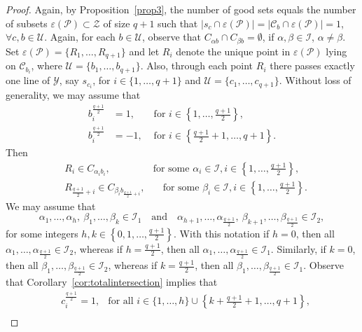\documentclass[11pt]{article}
\theoremstyle{definition}
\numberwithin{equation}{section}
\def\eps{\varepsilon}
\def\cC{\mathscr C}
\def\cI{\mathcal I}
\def\cP{\mathcal P}
\def\cU{\mathcal U}
\begin{document}
    
\begin{proof}
Again, by Proposition~\ref{prop3}, the number of good sets equals the number of subsets $\varepsilon(\mathcal{P}) \subset \mathcal{Z}$ of size $q+1$ such that $|s_c \cap \eps(\cP)| = |\cC_b \cap \eps(\cP)| = 1$, $\forall c,b \in \cU$. Again, for each $b \in \mathcal{U}$, observe that $C_{\alpha b} \cap C_{\beta b} = \emptyset$, if $\alpha, \beta \in \cI$, $\alpha \ne \beta$. Set $\eps(\cP) = \{R_1, \dots, R_{q+1}\}$ and let $R_i$ denote the unique point in $\varepsilon(\mathcal{P})$ lying on $\cC_{b_i}$, where $\mathcal{U} = \{b_1, \ldots, b_{q+1}\}$. Also, through each point $R_i$ there passes exactly one line of $\mathcal{Y}$, say $s_{c_i}$, for $i \in \{1, \ldots, q+1\}$ and $\cU=\{c_1,\ldots,c_{q+1}\}$. Without loss of generality, we may assume that 
\begin{align*}
b_i^{\frac{q+1}2} & =1, & \mbox{ for } i \in \left\{1,\ldots,\frac{q+1}2\right\}, \\
b_i^{\frac{q+1}2} & =-1, & \mbox{ for } i \in \left\{\frac{q+1}2+1,\ldots,q+1\right\}.
\end{align*}
Then
\begin{align*}
& R_i \in C_{\alpha_i b_i}, & \text{for some } \alpha_i \in \mathcal{I}, i \in \left\{1, \ldots, \frac{q+1}{2} \right\}, \\
& R_{\frac{q+1}{2}+i} \in C_{\beta_i b_{\frac{q+1}{2}+i}}, & \quad \text{for some } \beta_i \in \mathcal{I}, i \in \left\{1, \ldots, \frac{q+1}{2} \right\}. 
\end{align*}
We may assume that
\[
\alpha_1, \ldots, \alpha_h, \ \beta_1, \ldots, \beta_k \in \mathcal{I}_1
\quad \text{and} \quad
\alpha_{h+1}, \ldots, \alpha_{\frac{q+1}{2}}, \ \beta_{k+1}, \ldots, \beta_{\frac{q+1}{2}} \in \mathcal{I}_2,
\]
for some integers \( h, k \in \left\{0, 1, \ldots, \frac{q+1}{2} \right\} \). With this notation if \( h = 0 \), then all \( \alpha_1, \ldots, \alpha_{\frac{q+1}{2}} \in \mathcal{I}_2 \), whereas if \( h = \frac{q+1}{2} \), then all \( \alpha_1, \ldots, \alpha_{\frac{q+1}{2}} \in \mathcal{I}_1 \). Similarly, if \( k = 0 \), then all \( \beta_1, \ldots, \beta_{\frac{q+1}{2}} \in \mathcal{I}_2 \), whereas if \( k = \frac{q+1}{2} \), then all \( \beta_1, \ldots, \beta_{\frac{q+1}{2}} \in \mathcal{I}_1 \). Observe that Corollary~\ref{cor:totalintersection} implies that
\begin{align*}
& c_i^{\frac{q+1}{2}} = 1, & \text{for all } i \in \{1, \ldots, h\} \cup \left\{k + \frac{q+1}{2} + 1, \ldots, q+1\right\}, \\

\end{align*}
\end{proof}
\end{document}
